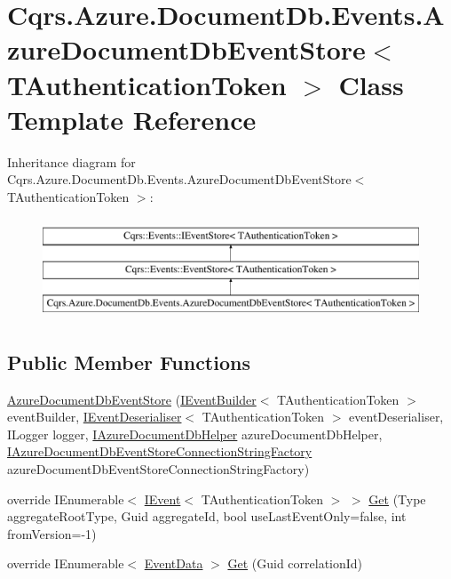 \hypertarget{classCqrs_1_1Azure_1_1DocumentDb_1_1Events_1_1AzureDocumentDbEventStore}{}\section{Cqrs.\+Azure.\+Document\+Db.\+Events.\+Azure\+Document\+Db\+Event\+Store$<$ T\+Authentication\+Token $>$ Class Template Reference}
\label{classCqrs_1_1Azure_1_1DocumentDb_1_1Events_1_1AzureDocumentDbEventStore}
Inheritance diagram for Cqrs.\+Azure.\+Document\+Db.\+Events.\+Azure\+Document\+Db\+Event\+Store$<$ T\+Authentication\+Token $>$\+:\begin{figure}[H]
\begin{center}
\leavevmode
\includegraphics[height=3.000000cm]{classCqrs_1_1Azure_1_1DocumentDb_1_1Events_1_1AzureDocumentDbEventStore}
\end{center}
\end{figure}
\subsection*{Public Member Functions}
\begin{DoxyCompactItemize}
\item 
\hyperlink{classCqrs_1_1Azure_1_1DocumentDb_1_1Events_1_1AzureDocumentDbEventStore_a0bbf294600f2dcebfcca28143aacd430}{Azure\+Document\+Db\+Event\+Store} (\hyperlink{interfaceCqrs_1_1Events_1_1IEventBuilder}{I\+Event\+Builder}$<$ T\+Authentication\+Token $>$ event\+Builder, \hyperlink{interfaceCqrs_1_1Events_1_1IEventDeserialiser}{I\+Event\+Deserialiser}$<$ T\+Authentication\+Token $>$ event\+Deserialiser, I\+Logger logger, \hyperlink{interfaceCqrs_1_1Azure_1_1DocumentDb_1_1IAzureDocumentDbHelper}{I\+Azure\+Document\+Db\+Helper} azure\+Document\+Db\+Helper, \hyperlink{interfaceCqrs_1_1Azure_1_1DocumentDb_1_1Events_1_1IAzureDocumentDbEventStoreConnectionStringFactory}{I\+Azure\+Document\+Db\+Event\+Store\+Connection\+String\+Factory} azure\+Document\+Db\+Event\+Store\+Connection\+String\+Factory)
\item 
override I\+Enumerable$<$ \hyperlink{interfaceCqrs_1_1Events_1_1IEvent}{I\+Event}$<$ T\+Authentication\+Token $>$ $>$ \hyperlink{classCqrs_1_1Azure_1_1DocumentDb_1_1Events_1_1AzureDocumentDbEventStore_a54f298fdde141166e23f01e4911bf188}{Get} (Type aggregate\+Root\+Type, Guid aggregate\+Id, bool use\+Last\+Event\+Only=false, int from\+Version=-\/1)
\item 
override I\+Enumerable$<$ \hyperlink{classCqrs_1_1Events_1_1EventData}{Event\+Data} $>$ \hyperlink{classCqrs_1_1Azure_1_1DocumentDb_1_1Events_1_1AzureDocumentDbEventStore_ac59ce599b768ce047869b8ac135f4e22}{Get} (Guid correlation\+Id)
\end{DoxyCompactItemize}

